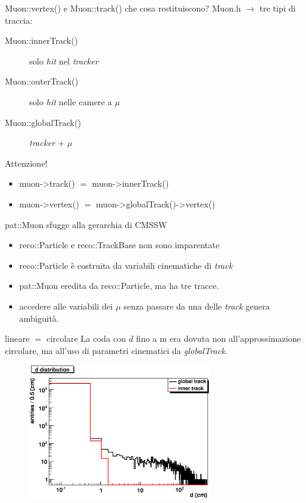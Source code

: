 \documentclass[italian]{beamer}
\begin{document}
\begin{frame}
    {Muon::vertex() e Muon::track()}
    {che cosa restituiscono?}
    Muon.h $\to$ tre tipi di traccia:
    \begin{description}
        \item[Muon::innerTrack()] solo \emph{hit} nel \emph{tracker}
        \item[Muon::outerTrack()] solo \emph{hit} nelle camere a $\mu$
        \item[Muon::globalTrack()] \emph{tracker} + $\mu$
    \end{description}

    \begin{block}
        {Attenzione!}
        \begin{itemize}
            \item muon->track() $=$ muon->innerTrack()
            \item muon->vertex() $=$ muon->globalTrack()->vertex()
        \end{itemize}
    \end{block}
\end{frame}

\begin{frame}
    {pat::Muon sfugge alla gerarchia di CMSSW}
    \begin{itemize}
        \item reco::Particle e reco::TrackBase non sono imparentate
        \item reco::Particle è costruita da variabili cinematiche di
            \emph{track}
        \item pat::Muon eredita da reco::Particle, ma ha tre tracce.
        \item accedere alle variabili dei $\mu$ senza passare da una delle
            \emph{track} genera ambiguità.
    \end{itemize}
\end{frame}
    
\begin{frame}
    {lineare $=$ circolare}
    La coda con $d$ fino a \unit[4]{m} era dovuta non all'approssimazione
    circolare, ma all'uso di parametri cinematici da \emph{globalTrack}.
\begin{figure}[h]
    \includegraphics[width=0.7\textwidth]{crea_istogrammi/glob_inn2.eps}
\end{figure}
\end{frame}
\end{document}
